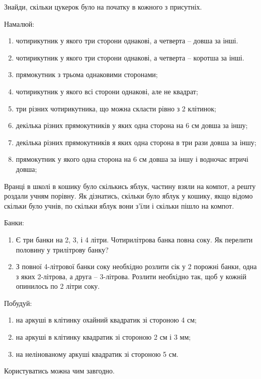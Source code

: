 Знайди, скільки цукерок було на початку в кожного з присутніх.


\problem
Намалюй:
\begin{enumerate}
    \item чотирикутник у якого три сторони однакові,
    а четверта – довша за інші.
    \item чотирикутник у якого три сторони однакові,
    а четверта – коротша за інші.
    \item прямокутник з трьома однаковими сторонами;
    \item чотирикутник у якого всі сторони однакові, але не квадрат;
    \item три різних чотирикутника, що можна скласти рівно з 2 клітинок;
    \item декілька різних прямокутників у яких одна сторона
    на 6 см довша за іншу;
    \item декілька різних прямокутників я яких одна сторона
    в три рази довша за іншу;
    \item прямокутник у якого одна сторона на 6 см довша за іншу
    і водночас втричі довша;
\end{enumerate}


\problem
Вранці в школі в кошику було скількись яблук, частину взяли на компот,
а решту роздали учням порівну.
Як дізнатись, скільки було яблук у кошику, якщо відомо скільки було учнів,
по скільки яблук вони з'їли і скільки пішло на компот.


\problem
Банки:
\begin{enumerate}
    \item Є три банки на 2, 3, і 4 літри. Чотирилітрова банка повна соку.
    Як перелити половину у трилітрову банку?
    \item З повної 4-літрової банки соку необхідно розлити сік 
    у 2 порожні банки, одна з яких 2-літрова, а друга – 3-літрова.
    Розлити необхідно так, щоб у кожній опинилось по 2 літри соку.
\end{enumerate}


\problem
Побудуй:
\begin{enumerate}
    \item на аркуші в клітинку охайний квадратик зі стороною 4 см;
    \item на аркуші в клітинку квадратик зі стороною 2 см і 3 мм;
    \item на нелінованому аркуші квадратик зі стороною 5 см.
\end{enumerate}
Користуватись можна чим завгодно.


